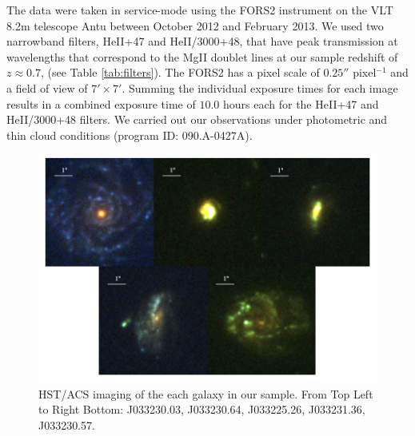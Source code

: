 \documentclass[twocolumn]{aastex6}
\begin{document}
The data were taken in service-mode using the FORS2 instrument on the VLT 8.2m telescope Antu between October 2012 and February 2013. We used two narrowband filters, HeII+47 and HeII/3000+48, that have peak transmission at wavelengths that correspond to the MgII doublet lines at our sample redshift of $z\approx 0.7$, (see Table \ref{tab:filters}). The FORS2 has a pixel scale of $0.25''$ pixel$^{-1}$ and a field of view of $7'\times7'$. Summing the individual exposure times for each image results in a combined exposure time of $10.0$ hours each for the HeII+47 and HeII/3000+48 filters. We carried out our observations under photometric and thin cloud conditions (program ID: 090.A-0427A).

\begin{figure}[!h]
\centering
\includegraphics[scale=.55]{sample_v2.png}
\caption{HST/ACS imaging of the each galaxy in our sample. From Top Left to Right Bottom: J033230.03, J033230.64, J033225.26, J033231.36, J033230.57.}
\end{figure}
\end{document}
